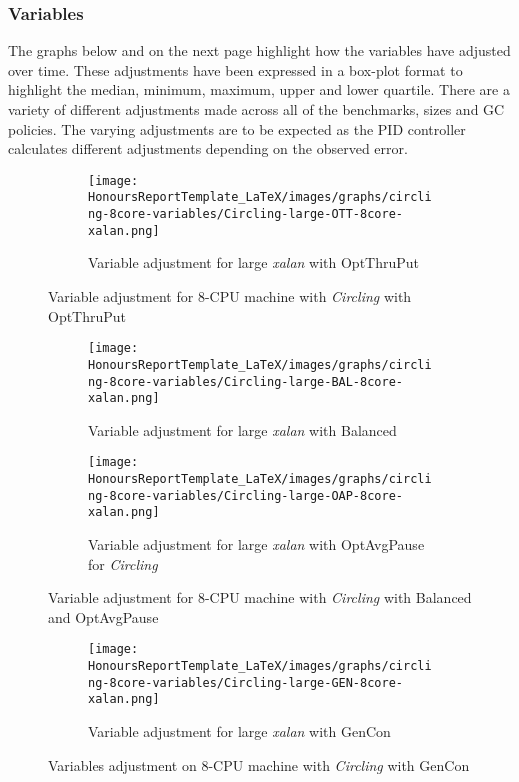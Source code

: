 \subsubsection{Variables}
The graphs below and on the next page highlight how the variables have adjusted over
time. These adjustments have been expressed in a box-plot format to
highlight the median, minimum, maximum, upper and lower quartile. There
are a variety of different adjustments made across all of the
benchmarks, sizes and GC policies. The varying adjustments are to be
expected as the PID controller calculates different adjustments
depending on the observed error.
\begin{figure}[H]
   \begin{subfigure} {1\textwidth}
       \texttt{[image: HonoursReportTemplate\_LaTeX/images/graphs/circling-8core-variables/Circling-large-OTT-8core-xalan.png]}
       \caption{Variable adjustment for large \emph{xalan} with OptThruPut}
   \end{subfigure}
   \caption{Variable adjustment for 8-CPU machine with \emph{Circling} with OptThruPut}
   \end{figure} 
   \newpage 
   \begin{figure} [H]
    \begin{subfigure} {1\textwidth}
       \texttt{[image: HonoursReportTemplate\_LaTeX/images/graphs/circling-8core-variables/Circling-large-BAL-8core-xalan.png]}
       \caption{Variable adjustment for large \emph{xalan} with Balanced}
   \end{subfigure}
    \begin{subfigure} {1\textwidth}
       \texttt{[image: HonoursReportTemplate\_LaTeX/images/graphs/circling-8core-variables/Circling-large-OAP-8core-xalan.png]}
       \caption{Variable adjustment for large \emph{xalan} with OptAvgPause for \emph{Circling}}
   \end{subfigure}
    \caption{Variable adjustment for 8-CPU machine with \emph{Circling} with Balanced and OptAvgPause }
    \end{figure} 
    \newpage 
    \begin{figure} [H]

    \begin{subfigure} {1\textwidth}
       \texttt{[image: HonoursReportTemplate\_LaTeX/images/graphs/circling-8core-variables/Circling-large-GEN-8core-xalan.png]}
       \caption{Variable adjustment for large \emph{xalan} with GenCon}
   \end{subfigure}
   
    \caption{Variables adjustment on 8-CPU machine with \emph{Circling} with GenCon}
    \label{fig:Circling-variables}
\end{figure}
